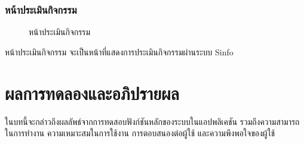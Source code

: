\documentclass[14pt,oneside,openright,a4paper]{cpe-thai-project}
\begin{document}
\subsection{หน้าประเมินกิจกรรม}
\begin{figure}[!h]\centering
  \setlength{\fboxrule}{0.5mm} %
  \setlength{\fboxsep}{0.5cm}
  \caption{หน้าประเมินกิจกรรม}\label{fig:ui11}
\end{figure}
\hspace*{1cm} หน้าประเมินกิจกรรม จะเป็นหน้าที่แสดงการประเมินกิจกรรมผ่านระบบ Sinfo

\newpage

\chapter{ผลการทดลองและอภิปรายผล} 
ในบทนี้จะกล่าวถึงผลลัพธ์จากการทดสอบฟังก์ชันหลักของระบบในแอปพลิเคชัน รวมถึงความสามารถในการทำงาน ความเหมาะสมในการใช้งาน การตอบสนองต่อผู้ใช้ และความพึงพอใจของผู้ใช้
\end{document}
